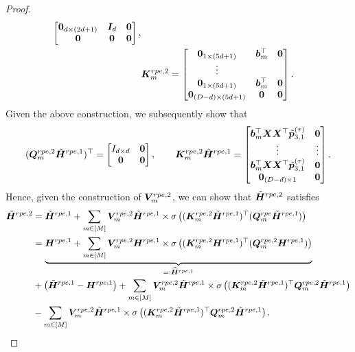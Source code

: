 \begin{proof}
\begin{align*}
\begin{bmatrix}
           \boldsymbol{0}_{d\times(2d+1)}&\boldsymbol{I}_d&\boldsymbol{0}\\
           \boldsymbol{0}&\boldsymbol{0}&\boldsymbol{0}
       \end{bmatrix},\\
       &\boldsymbol{K}_m^{rpe,2} =\begin{bmatrix}
           \boldsymbol{0}_{1\times(5d+1)}&\boldsymbol{b}_m^\top&\boldsymbol{0}\\
           \vdots&&\\
           \boldsymbol{0}_{1\times(5d+1)}&\boldsymbol{b}_m^\top&\boldsymbol{0} \\
           \boldsymbol{0}_{(D-d)\times(5d+1)}&\boldsymbol{0}&\boldsymbol{0}
       \end{bmatrix}.
    \end{align*}
    Given the above construction, we subsequently show that
    \begin{align*}
       (\boldsymbol{Q}_m^{rpe,2}\tilde{\boldsymbol{H}}^{rpe,1})^\top=\begin{bmatrix}
           I_{d\times d}&\boldsymbol{0}\\
           \boldsymbol{0}&\boldsymbol{0}
       \end{bmatrix},\qquad \boldsymbol{K}_m^{rpe,2}\tilde{\boldsymbol{H}}^{rpe,1} = \begin{bmatrix}
            \boldsymbol{b}_m^\top\boldsymbol{X}\boldsymbol{X}^\top\tilde{\boldsymbol{p}}_{3,1}^{(\tau)}&\boldsymbol{0}\\
            \vdots &\vdots\\
            \boldsymbol{b}_m^\top\boldsymbol{X}\boldsymbol{X}^\top\tilde{\boldsymbol{p}}_{3,1}^{(\tau)}&\boldsymbol{0}\\
            \boldsymbol{0}_{(D-d)\times 1}&\boldsymbol{0}
        \end{bmatrix}.
    \end{align*}
    Hence, given the construction of $\boldsymbol{V}_m^{rpe,2}$, we can show that $
        \tilde{\boldsymbol{H}}^{rpe,2} $ satisfies
        \begin{align*}
           \tda H^{rpe,2} &= \tda H^{rpe,1}+\sum_{m\in[M]}\bfa V_m^{rpe,2}\tda H^{rpe,1}\times\sigma\lef((\bfa K^{rpe,2}_m\tda H^{rpe,1})^\top(\bfa Q_m^{rpe}\tda H^{rpe,1})\rig)\\
           &=\ub{\bfa H^{rpe,1}+\sum_{m\in[M]}\bfa V_m^{rpe,2}\bfa H^{rpe,1}\times\sigma\lef((\bfa K_m^{rpe,2}\bfa H^{rpe,1})^\top(\bfa Q_m^{rpe,2}\bfa H^{rpe,1})\rig)}_{=:\wha H^{rpe,1}}\\
           &+\lef(\tda H^{rpe,1}-\bfa H^{rpe,1}\rig)+\sum_{m\in[M]}\bfa V_m^{rpe,2}\tda H^{rpe,1}\times\sigma\lef((\bfa K_m^{rpe,2}\tda H^{rpe,1})^\top\bfa Q_m^{rpe,2}\tda H^{rpe,1}\rig)\\
           &-\sum_{m\in[M]}\bfa V_m^{rpe,2}\tda H^{rpe,1}\times\sigma\lef((\bfa K_m^{rpe,2}\tda H^{rpe,1})^\top\bfa Q_m^{rpe,2}\tda H^{rpe,1}\rig).

\end{align*}
\end{proof}
